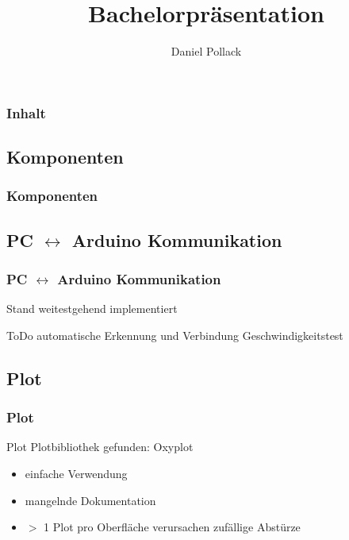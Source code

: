 \documentclass{beamer}
\author{Daniel Pollack}
\title{Bachelorpräsentation}
\institute{Bauhaus-Universität Weimar\\Lehrstuhl: Human-Computer Interaction}
\begin{document}
\begin{frame}
 \titlepage
\end{frame}

\begin{frame}
 \frametitle{Inhalt}
 \tableofcontents
\end{frame}

\begin{frame}
 \section{Komponenten}
 \frametitle{Komponenten}
\end{frame}

\begin{frame}
 \section{PC $\leftrightarrow$ Arduino Kommunikation}
 \frametitle{PC $\leftrightarrow$ Arduino Kommunikation}
 \begin{block}{Stand}
  weitestgehend implementiert
 \end{block}
 \begin{block}{ToDo}
  automatische Erkennung und Verbindung
  Geschwindigkeitstest
 \end{block}
\end{frame}

\begin{frame}
 \section{Plot}
 \frametitle{Plot}
 \begin{block}{Plot}
  Plotbibliothek gefunden: Oxyplot
  \begin{itemize}
  \item einfache Verwendung
  \item mangelnde Dokumentation
  \item $>$ 1 Plot pro Oberfläche verursachen zufällige Abstürze
 \end{itemize}
 \end{block}
\end{frame}
\end{document}
